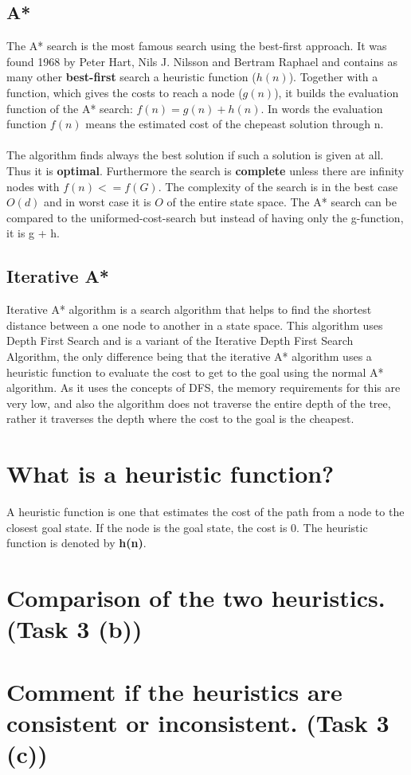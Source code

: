 \documentclass[11pt]{article}
\begin{document}
\subsection{A*}
The A* search is the most famous search using the best-first approach. It was found 1968 by Peter Hart, Nils J. Nilsson and Bertram Raphael and contains as many other \textbf{best-first} search a heuristic function ($h(n)$). Together with a function, which gives the costs to reach a node ($g(n)$), it builds the evaluation function of the A* search: $f(n) = g(n) + h(n)$. In words the evaluation function $f(n)$ means the estimated cost of the chepeast solution through n.\\
\\
The algorithm finds always the best solution if such a  solution is given at all. Thus it is \textbf{optimal}. Furthermore the search is \textbf{complete} unless there are infinity nodes with $f(n) <= f(G)$. The complexity of the search is in the best case $O(d)$ and in worst case it is $O$ of the entire state space. The A* search can be compared to the uniformed-cost-search but instead of having only the g-function, it is g + h.

\subsection{Iterative A*}
Iterative A* algorithm is a search algorithm that helps to find the shortest distance between a one node to another in a state space. This algorithm uses Depth First Search and is a variant of the Iterative Depth First Search Algorithm, the only difference being that the iterative A* algorithm uses a heuristic function to evaluate the cost to get to the goal using the normal A* algorithm. As it uses the concepts of DFS, the memory requirements for this are very low, and also the algorithm does not traverse the entire depth of the tree, rather it traverses the depth where the cost to the goal is the cheapest.

\newpage
\section{What is a heuristic function?}
A heuristic function is one that estimates the cost of the path from a node to the closest goal state. If the node is the goal state, the cost is 0. The heuristic function is denoted by \textbf{h(n)}.

\newpage
\section{Comparison of the two heuristics. (Task 3 (b))}

\newpage
\section{Comment if the heuristics are consistent or inconsistent. (Task 3 (c))}
\end{document}
